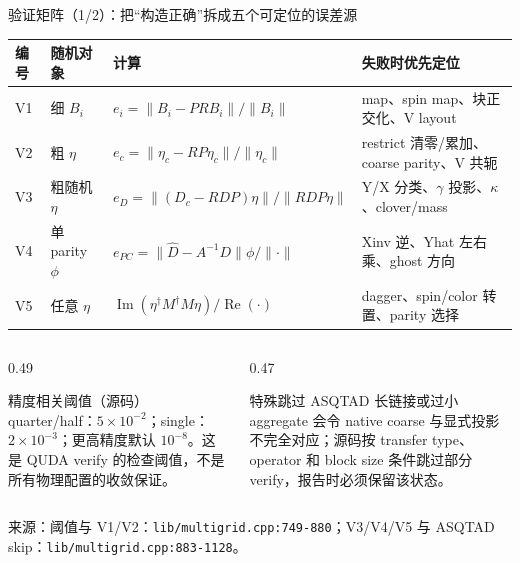 \documentclass[UTF8,aspectratio=169,11pt]{ctexbeamer}
\newcommand{\source}[1]{\vspace{0.05em}\par{\raggedright\scriptsize\color{muted}来源：#1\par}}
\newcommand{\codepath}[1]{\nolinkurl{#1}}
\begin{document}
\begin{frame}[t]{验证矩阵（1/2）：把“构造正确”拆成五个可定位的误差源}
  \scriptsize
  \begin{tabularx}{\textwidth}{@{}l l X X@{}}
    \toprule
    编号 & 随机对象 & 计算 & 失败时优先定位 \\
    \midrule
    V1 & 细 \(B_i\) & \(e_i=\|B_i-P R B_i\|/\|B_i\|\) & map、spin map、块正交化、V layout \\
    V2 & 粗 \(\eta\) & \(e_c=\|\eta_c-RP\eta_c\|/\|\eta_c\|\) & restrict 清零/累加、coarse parity、V 共轭 \\
    V3 & 粗随机 \(\eta\) & \(e_D=\|(D_c-RDP)\eta\|/\|RDP\eta\|\) & Y/X 分类、\(\gamma\) 投影、\(\kappa\)、clover/mass \\
    V4 & 单 parity \(\phi\) & \(e_{PC}=\|\hat D-A^{-1}D\|\phi/\|\cdot\|\) & Xinv 逆、Yhat 左右乘、ghost 方向 \\
    V5 & 任意 \(\eta\) & \(\operatorname{Im}(\eta^\dagger M^\dagger M\eta)/\operatorname{Re}(\cdot)\) & dagger、spin/color 转置、parity 选择 \\
    \bottomrule
  \end{tabularx}
  \vspace{0.14cm}
  \begin{columns}[T,totalwidth=\textwidth]
    \begin{column}{0.49\textwidth}
      \begin{block}{精度相关阈值（源码）}
        quarter/half：\(5\times10^{-2}\)；single：\(2\times10^{-3}\)；更高精度默认 \(10^{-8}\)。这是 QUDA verify 的检查阈值，不是所有物理配置的收敛保证。
      \end{block}
    \end{column}
    \begin{column}{0.47\textwidth}
      \begin{alertblock}{特殊跳过}
        ASQTAD 长链接或过小 aggregate 会令 native coarse 与显式投影不完全对应；源码按 transfer type、operator 和 block size 条件跳过部分 verify，报告时必须保留该状态。
      \end{alertblock}
    \end{column}
  \end{columns}
  \source{阈值与 V1/V2：\codepath{lib/multigrid.cpp:749-880}；V3/V4/V5 与 ASQTAD skip：\codepath{lib/multigrid.cpp:883-1128}。}
\end{frame}
\end{document}
